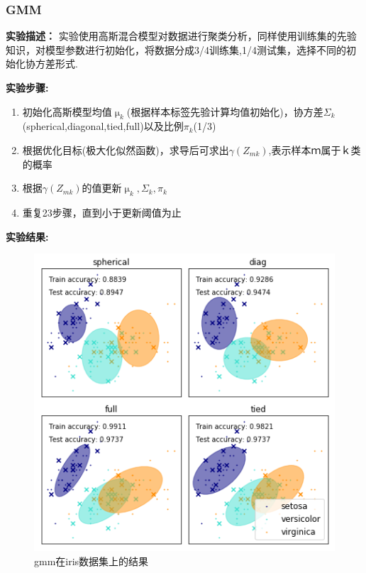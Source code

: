\documentclass{article}
\begin{document}
\subsubsection{GMM}
\textbf{实验描述：}
实验使用高斯混合模型对数据进行聚类分析，同样使用训练集的先验知识，对模型参数进行初始化，将数据分成3/4训练集,1/4测试集，选择不同的初始化协方差形式.

\textbf{实验步骤:}
\begin{enumerate}
\item 初始化高斯模型均值$\upmu_k$(根据样本标签先验计算均值初始化)，协方差$\Sigma_k$(spherical,diagonal,tied,full)以及比例$\pi_k$(1/3)
\item 根据优化目标(极大化似然函数)，求导后可求出$\gamma(Z_{mk})$,表示样本ｍ属于ｋ类的概率
\item 根据$\gamma(Z_{mk})$的值更新$\upmu_k,\Sigma_k,\pi_k$
\item 重复23步骤，直到小于更新阈值为止
\end{enumerate}
\textbf{实验结果:}
\begin{figure}[htbp]
	\centering\includegraphics[scale=1.1]{gmm_iris}
	\caption{gmm在iris数据集上的结果}
\end{figure}

\end{document}
